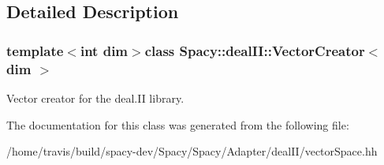 \subsection{\-Detailed \-Description}
\subsubsection*{template$<$int dim$>$class Spacy\-::deal\-I\-I\-::\-Vector\-Creator$<$ dim $>$}

\-Vector creator for the deal.\-I\-I library. 

\-The documentation for this class was generated from the following file\-:\begin{DoxyCompactItemize}
\item 
/home/travis/build/spacy-\/dev/\-Spacy/\-Spacy/\-Adapter/deal\-I\-I/vector\-Space.\-hh\end{DoxyCompactItemize}

